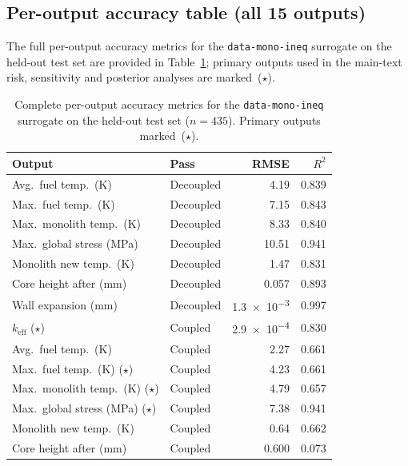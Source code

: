 \documentclass[pdflatex,sn-mathphys-num]{sn-jnl}
\theoremstyle{thmstyleone}
\theoremstyle{thmstyletwo}
\theoremstyle{thmstylethree}
\begin{document}
\begin{appendices}
\section{Per-output accuracy table (all 15 outputs)}\label{sec:appendix_metrics}

The full per-output accuracy metrics for the \texttt{data-mono-ineq} surrogate on the
held-out test set are provided in Table~\ref{tab:accuracy_full}; primary outputs
used in the main-text risk, sensitivity and posterior analyses are marked~($\star$).

\begin{table}[ht]
\caption{%
  Complete per-output accuracy metrics for the \texttt{data-mono-ineq} surrogate
  on the held-out test set ($n=435$). Primary outputs marked~($\star$).
}\label{tab:accuracy_full}
\begin{tabular*}{\textwidth}{@{\extracolsep\fill}llrr@{}}
\toprule
Output & Pass & RMSE & $R^2$ \\
\midrule
Avg.\ fuel temp.\ (K)                 & Decoupled & 4.19 & 0.839 \\
Max.\ fuel temp.\ (K)                 & Decoupled & 7.15 & 0.843 \\
Max.\ monolith temp.\ (K)             & Decoupled & 8.33 & 0.840 \\
Max.\ global stress (MPa)             & Decoupled & 10.51 & 0.941 \\
Monolith new temp.\ (K)               & Decoupled & 1.47 & 0.831 \\
Core height after (mm)                & Decoupled & 0.057 & 0.893 \\
Wall expansion (mm)                   & Decoupled & \num{1.3e-3} & 0.997 \\
$k_{\mathrm{eff}}$ ($\star$)          & Coupled   & \num{2.9e-4} & 0.830 \\
Avg.\ fuel temp.\ (K)                 & Coupled   & 2.27 & 0.661 \\
Max.\ fuel temp.\ (K) ($\star$)       & Coupled   & 4.23 & 0.661 \\
Max.\ monolith temp.\ (K) ($\star$)   & Coupled   & 4.79 & 0.657 \\
Max.\ global stress (MPa) ($\star$)   & Coupled   & 7.38 & 0.941 \\
Monolith new temp.\ (K)               & Coupled   & 0.64 & 0.662 \\
Core height after (mm)                & Coupled   & 0.600 & 0.073 \\

\end{tabular*}
\end{table}
\end{appendices}
\end{document}
